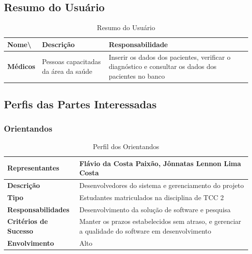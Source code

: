 \begin{anexosenv}
	\subsection{Resumo do Usuário}

	\begin{table}[]
		\centering
		\caption{Resumo do Usuário}
		\begin{tabular}{@{}|l|l|l|@{}}
			\toprule
			\textbf{Nome\textbackslash{}} & \textbf{Descrição}                   & \textbf{Responsabilidade}                                                                           \\ \midrule
			\textbf{Médicos}              & Pessoas capacitadas da área da saúde & Inserir os dados dos pacientes, verificar o diagnóstico e consultar os dados dos pacientes no banco \\ \bottomrule
		\end{tabular}
		\label{table:Resumo do Usuário}
	\end{table}

	\subsection{Perfis das Partes Interessadas}

	\subsubsection{Orientandos}

	\begin{table}[]
		\centering
		\caption{Perfil dos Orientandos}
		\begin{tabular}{@{}|l|l|@{}}
			\toprule
			\textbf{Representantes}       & Flávio da Costa Paixão, Jônnatas Lennon Lima Costa                                                \\ \midrule
			\textbf{Descrição}            & Desenvolvedores do sistema e gerenciamento do projeto                                             \\ \midrule
			\textbf{Tipo}                 & Estudantes matriculados na disciplina de TCC 2                                                    \\ \midrule
			\textbf{Responsabilidades}    & Desenvolvimento da solução de software e pesquisa                                                 \\ \midrule
			\textbf{Critérios de Sucesso} & Manter os prazos estabelecidos sem atraso, e gerenciar a qualidade do software em desenvolvimento \\ \midrule
			\textbf{Envolvimento}         & Alto                                                                                              \\ \bottomrule
		\end{tabular}
		\label{table:Perfil dos Orientandos}
	\end{table}


\end{anexosenv}
